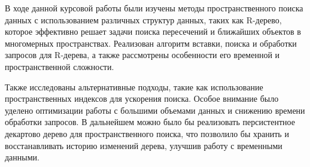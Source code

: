 \documentclass[12pt]{article}
\begin{document}
В ходе данной курсовой работы были изучены методы пространственного поиска данных с использованием различных структур данных, таких как R-дерево, которое эффективно решает задачи поиска пересечений и ближайших объектов в многомерных пространствах. Реализован алгоритм вставки, поиска и обработки запросов для R-дерева, а также рассмотрены особенности его временной и пространственной сложности. 

Также исследованы альтернативные подходы, такие как использование пространственных индексов для ускорения поиска. Особое внимание было уделено оптимизации работы с большими объемами данных и снижению времени обработки запросов. В дальнейшем можно было бы реализовать персистентное декартово дерево для пространственного поиска, что позволило бы хранить и восстанавливать историю изменений дерева, улучшив работу с временными данными. 
\end{document}
